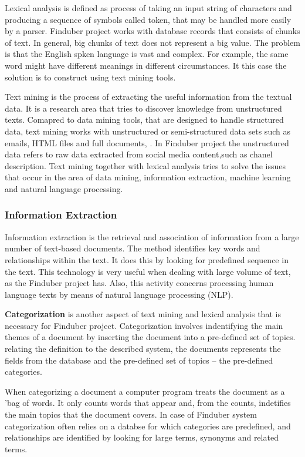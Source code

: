 Lexical analysis is defined as process of taking an input string of characters and producing a sequence of symbols called token, that may be handled more easily by a parser. Finduber project works with database records that consists of chunks of text. In general, big chunks of text does not represent a big value. The problem is that the English spken language is vast and complex. For example, the same word might have different meanings in different circumstances. It this case the solution is to construct using text mining tools. 

Text mining is the process of extracting the useful information from the textual data. It is a research area that tries to discover knowledge from unstructured texts. Comapred to data mining tools, that are designed to handle structured data, text mining works with unstructured or semi-structured data sets such as emails, HTML files and full documents, \cite{survey}. In Finduber project the unstructured data refers to raw data extracted from social media content,such as chanel description. Text mining together with lexical analysis tries to solve the issues that occur in the area of data mining, information extraction, machine learning and natural language processing. 

\subsubsection{Information Extraction}

Information extraction is the retrieval and association of information from a large number of text-based documents. The method identifies key words and relationships within the text. It does this by looking for predefined sequence in the text. This technology is very useful when dealing with large volume of text, as the Finduber project has. Also, this activity concerns processing human language texts by means of natural language processing (NLP). 

\textbf{Categorization} is another aspect of text mining and lexical analysis that is necessary for Finduber project. Categorization involves indentifying the main themes of a document by inserting the document into a pre-defined set of topics. relating the definition to the described system, the documents represents the fields from the database and the pre-defined set of topics -- the pre-defined categories. 

When categorizing a document a computer program treats the document as a 'bag of words. It only counts words that appear and, from the counts, indetifies the main topics that the document covers. In case of Finduber system categorization often relies on a databse for which categories are predefined, and relationships are identified by looking for large terms, synonyms and related terms.

